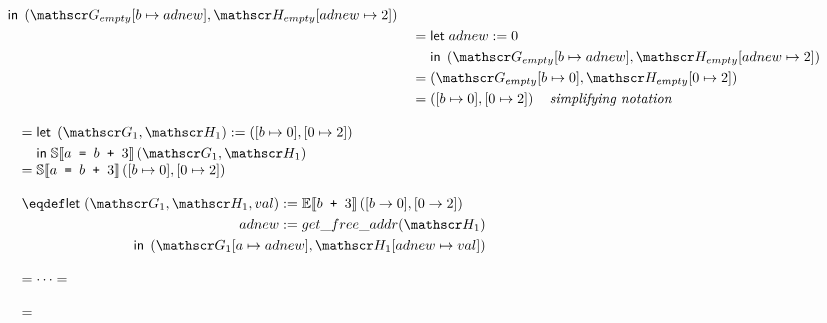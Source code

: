 \begin{figure}
\[\begin{array}{l}
\begin{aligned}[t]
\begin{aligned}[t]
          &\inm \left(\Glo_{empty}[b \mapsto adnew], \Hea_{empty}[adnew \mapsto 2]\right) \\
        \end{aligned}\\
        &\quad=
        \begin{aligned}[t]
          &\letm adnew := 0 \\
          &\inm \left(\Glo_{empty}[b \mapsto adnew], \Hea_{empty}[adnew \mapsto 2]\right) \\
        \end{aligned}\\
        &\quad= \left(\Glo_{empty}[b \mapsto 0], \Hea_{empty}[0 \mapsto 2]\right) \\
        &\quad= \left([b \mapsto 0], [0 \mapsto 2]\right) \quad \textit{simplifying notation} \\
      \end{aligned}\\
    \\
    \quad=
      \begin{aligned}[t]
        &\letm \left(\Glo_1, \Hea_1\right) := \left([b \mapsto 0], [0 \mapsto 2]\right) \\
        &\inm \Ctx{S}{a \texttt{ = } b \texttt{ + } 3}\left(\Glo_1, \Hea_1\right) \\
      \end{aligned}\\
    \quad=\Ctx{S}{a \texttt{ = } b \texttt{ + } 3}\left([b \mapsto 0], [0 \mapsto 2]\right) \\
    \\
    \quad\eqdef
    \begin{aligned}[t]
      \letm
        \begin{aligned}[t]
          \left(\Glo_1, \Hea_1, val\right) &:= \Ctx{E}{b \texttt{ + } 3}\left([b \to 0], [0 \to 2]\right) \\
          adnew &:= get\_free\_addr(\Hea_1) \\
        \end{aligned}\\
      \quad \inm \left(\Glo_1[a \mapsto adnew], \Hea_1[adnew \mapsto val]\right) \\
    \end{aligned}\\
    \\
    \quad= \cdots = \\
    \\
    \quad=
    \begin{aligned}[t]

\end{aligned}
\end{array}\]
\end{figure}
